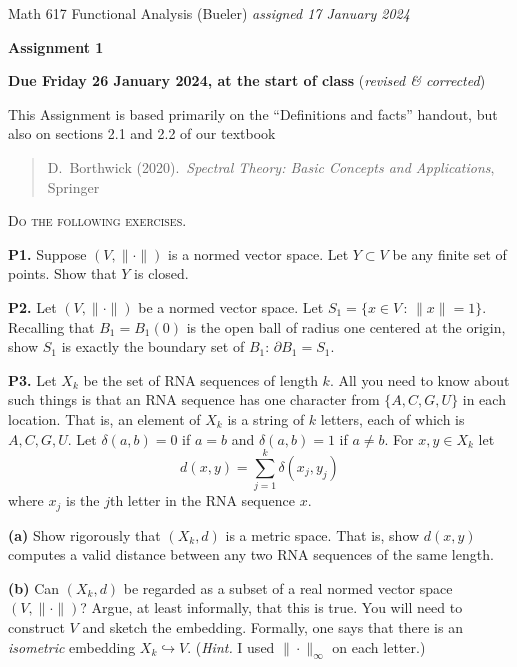 \documentclass[12pt]{amsart}
\newcommand{\prob}[1]{\bigskip\noindent\textbf{#1.}\quad }
\newcommand{\epart}[1]{\medskip\noindent\textbf{(#1)}\quad }
\begin{document}
\scriptsize \noindent Math 617 Functional Analysis (Bueler) \hfill \emph{assigned 17 January 2024}
\normalsize\medskip

\Large\centerline{\textbf{Assignment 1}}
\large
\medskip

\centerline{\textbf{Due Friday 26 January 2024, at the start of class} (\emph{revised \& corrected})}
\medskip
\normalsize

\thispagestyle{empty}

\bigskip
\noindent This Assignment is based primarily on the ``Definitions and facts'' handout, but also on sections 2.1 and 2.2 of our textbook

\begin{quote}
D.~Borthwick (2020).~\emph{Spectral Theory: Basic Concepts and Applications}, Springer
\end{quote}

\medskip
\noindent \textsc{Do the following exercises.}
\smallskip


\prob{P1}  Suppose $(V,\|\cdot\|)$ is a normed vector space.  Let $Y \subset V$ be any finite set of points.  Show that $Y$ is closed.

\prob{P2}  Let $(V,\|\cdot\|)$ be a normed vector space.  Let $S_1=\{x\in V\,:\,\|x\|=1\}$.  Recalling that $B_1=B_1(0)$ is the open ball of radius one centered at the origin, show $S_1$ is exactly the boundary set of $B_1$: $\partial B_1=S_1$.

\prob{P3}  Let $X_k$ be the set of RNA sequences of length $k$.  All you need to know about such things is that an RNA sequence has one character from $\{A,C,G,U\}$ in each location.  That is, an element of $X_k$ is a string of $k$ letters, each of which is $A,C,G,U$.  Let $\delta(a,b)=0$ if $a=b$ and $\delta(a,b)=1$ if $a\ne b$.  For $x,y \in X_k$ let
	$$d(x,y) = \sum_{j=1}^k \delta(x_j,y_j)$$
where $x_j$ is the $j$th letter in the RNA sequence $x$.

\epart{a}  Show rigorously that $(X_k,d)$ is a metric space.  That is, show $d(x,y)$ computes a valid distance between any two RNA sequences of the same length.

\epart{b}  Can $(X_k,d)$ be regarded as a subset of a real normed vector space $(V,\|\cdot\|)$?  Argue, at least informally, that this is true.  You will need to construct $V$ and sketch the embedding.  Formally, one says that there is an \emph{isometric} embedding $X_k \hookrightarrow V$.  (\emph{Hint.}  I used $\|\cdot\|_\infty$ on each letter.)
\end{document}
